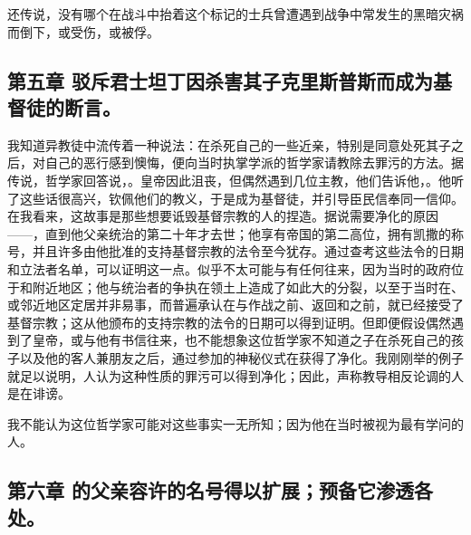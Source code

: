 还传说，没有哪个在战斗中抬着这个标记的士兵曾遭遇到战争中常发生的黑暗灾祸而倒下，或受伤，或被俘。\par


\subsection{第五章 驳斥君士坦丁因杀害其子克里斯普斯而成为基督徒的断言。}

我知道异教徒中流传着一种说法：在杀死自己的一些近亲，特别是同意处死其子之后，对自己的恶行感到懊悔，便向当时执掌学派的哲学家请教除去罪污的方法。据传说，哲学家回答说，。皇帝因此沮丧，但偶然遇到几位主教，他们告诉他，。他听了这些话很高兴，钦佩他们的教义，于是成为基督徒，并引导臣民信奉同一信仰。在我看来，这故事是那些想要诋毁基督宗教的人的捏造。据说需要净化的原因——，直到他父亲统治的第二十年才去世；他享有帝国的第二高位，拥有凯撒的称号，并且许多由他批准的支持基督宗教的法令至今犹存。通过查考这些法令的日期和立法者名单，可以证明这一点。似乎不太可能与有任何往来，因为当时的政府位于和附近地区；他与统治者的争执在领土上造成了如此大的分裂，以至于当时在、或邻近地区定居并非易事，而普遍承认在与作战之前、返回和之前，就已经接受了基督宗教；这从他颁布的支持宗教的法令的日期可以得到证明。但即便假设偶然遇到了皇帝，或与他有书信往来，也不能想象这位哲学家不知道之子在杀死自己的孩子以及他的客人兼朋友之后，通过参加的神秘仪式在获得了净化。我刚刚举的例子就足以说明，人认为这种性质的罪污可以得到净化；因此，声称教导相反论调的人是在诽谤。\par

我不能认为这位哲学家可能对这些事实一无所知；因为他在当时被视为最有学问的人。\par


\subsection{第六章 的父亲容许的名号得以扩展；预备它渗透各处。}

